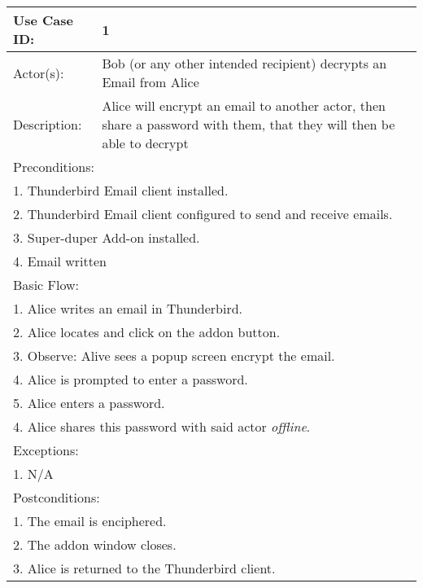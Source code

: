 \begin{longtable} {|p{3cm}|p{9cm}|} %
	\hline
Use Case ID: & 1\\
	\hline
Actor(s): & Bob (or any other intended recipient) decrypts an Email from Alice \\
	\hline
Description: & Alice will encrypt an email to another actor, then share a password with them, that they will then be able to decrypt \\
	\hline
	\multicolumn{2}{|l|}{Preconditions:} \\
	\multicolumn{2}{|l|}{1. Thunderbird Email client installed.} \\
	\multicolumn{2}{|l|}{2. Thunderbird Email client configured to send and receive emails.}\\
	\multicolumn{2}{|l|}{3. Super-duper Add-on installed.} \\
	\multicolumn{2}{|l|}{4. Email written} \\
	\hline
	\multicolumn{2}{|l|}{Basic Flow:} \\
	\multicolumn{2}{|l|}{1. Alice writes an email in Thunderbird.}\\
	\multicolumn{2}{|l|}{2. Alice locates and click on the addon button.} \\
	\multicolumn{2}{|l|}{3. Observe: Alive sees a popup screen encrypt the email.} \\
	\multicolumn{2}{|l|}{4. Alice is prompted to enter a password.}\\
	\multicolumn{2}{|l|}{5. Alice enters a password.} \\
	\multicolumn{2}{|l|}{4. Alice shares this password with said actor \emph{offline}.}\\
	\hline
	\hline
	\multicolumn{2}{|l|}{Exceptions:} \\
	\multicolumn{2}{|l|}{1. N/A} \\
	\hline
	\hline
	\multicolumn{2}{|l|}{Postconditions:} \\
	\multicolumn{2}{|l|}{1. The email is enciphered.} \\
	\multicolumn{2}{|l|}{2. The addon window closes.} \\
	\multicolumn{2}{|l|}{3. Alice is returned to the Thunderbird client.} \\
	\hline
\end{longtable}

